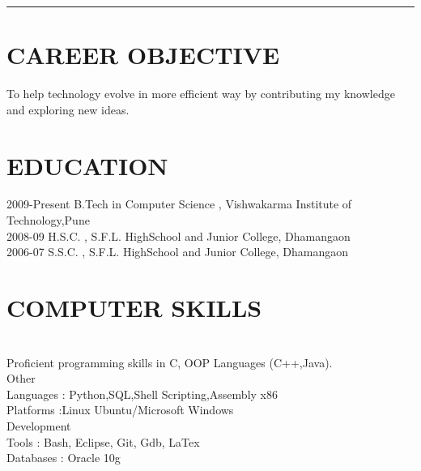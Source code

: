 \documentclass{res}
\begin{document}
 


\address{\bf  CONTACT DETAILS\\ \\ Email : aakash.agrawal17@gmail.com\\Ph : +91-9503832567 }
\address{\bf POSTAL ADDRESS \\ Shivaji Nagar, \\ Dhamangaon(Rly) 444709 \\  (07222) 237209}

\begin{resume}
\rule{5.2in}{1pt}
\section{CAREER OBJECTIVE}          
    To help technology evolve in more efficient way by contributing my knowledge and exploring new ideas.           
 
\section{EDUCATION}          
    2009-Present \hspace{2mm} B.Tech in Computer Science , Vishwakarma Institute of Technology,Pune\hspace{2mm}{\bf CPI-9.35}\\        
    2008-09 \hspace{11mm}H.S.C. , S.F.L. HighSchool and Junior College, Dhamangaon\hspace{20mm}{\bf 94.00 \% }\\
    2006-07 \hspace{11mm}S.S.C. , S.F.L. HighSchool and Junior College, Dhamangaon\hspace{22mm}{\bf 87.23 \% }

\section{COMPUTER SKILLS}          
    \\         
    Proficient programming skills in C, OOP Languages (C++,Java).\\
	{Other \\Languages} \hspace{}: Python,SQL,Shell Scripting,Assembly x86\\
 	Platforms \hspace{}:Linux Ubuntu/Microsoft Windows\\
	{Development \\Tools} \hspace{}: Bash, Eclipse, Git, Gdb, LaTex\\
	Databases \hspace{}: Oracle 10g
 

\end{resume}
\end{document}
